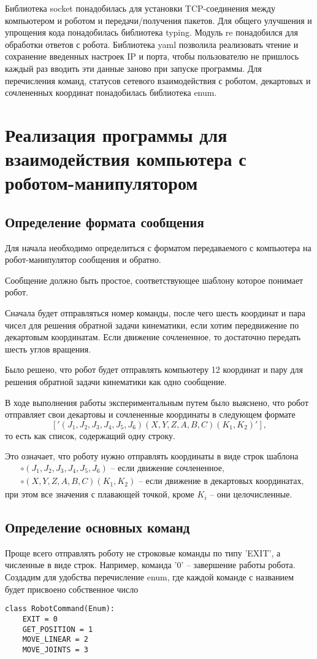 \documentclass[a4paper,14pt]{extarticle}
\begin{document}
Библиотека socket понадобилась для установки TCP-соединения между компьютером и роботом
и передачи/получения пакетов. Для общего улучшения и упрощения кода понадобилась
библиотека typing. Модуль re понадобился для обработки ответов с робота. Библиотека
yaml позволила реализовать чтение и сохранение введенных настроек IP и порта, чтобы
пользователю не пришлось каждый раз вводить эти данные заново при запуске программы.
Для перечисления команд, статусов сетевого взаимодействия с роботом,
декартовых и сочлененных координат понадобилась библиотека enum.


\section{Реализация программы для взаимодействия компьютера с роботом-манипулятором}
\subsection{Определение формата сообщения}
Для начала необходимо определиться
с форматом передаваемого с компьютера
на робот-манипулятор сообщения и обратно.


Сообщение должно быть простое, соответствующее
шаблону которое понимает робот.


Сначала будет отправляться номер команды, после чего
шесть координат и пара чисел для решения
обратной задачи кинематики, если хотим
передвижение по декартовым координатам.
Если движение сочлененное, то достаточно
передать шесть углов вращения.


Было решено, что робот будет отправлять компьютеру
12 координат и пару для решения обратной задачи кинематики
как одно сообщение.


В ходе выполнения работы экспериментальным путем было выяснено, что
робот отправляет свои декартовы и сочлененные координаты
в следующем формате
$$
['(J_1,J_2,J_3,J_4,J_5,J_6)(X,Y,Z,A,B,C)(K_1,K_2)'],
$$
то есть как список, содержащий одну строку.


Это означает, что роботу нужно отправлять
координаты в виде строк шаблона
\begin{align*}
    &\circ (J_1,J_2,J_3,J_4,J_5,J_6)\text{ -- если движение сочлененное,}\\
    &\circ (X,Y,Z,A,B,C)(K_1,K_2)\text{ -- если движение в декартовых координатах},
\end{align*}
при этом все значения с плавающей точкой, кроме $K_i$ -- они целочисленные.


\subsection{Определение основных команд}
Проще всего отправлять роботу не строковые команды по типу 'EXIT',
а численные в виде строк. Например, команда '0' -- завершение работы
робота. Создадим для удобства перечисление enum, где каждой
команде с названием будет присвоено собственное число
\begin{lstlisting}
class RobotCommand(Enum):
    EXIT = 0
    GET_POSITION = 1
    MOVE_LINEAR = 2
    MOVE_JOINTS = 3
\end{lstlisting}
\end{document}
